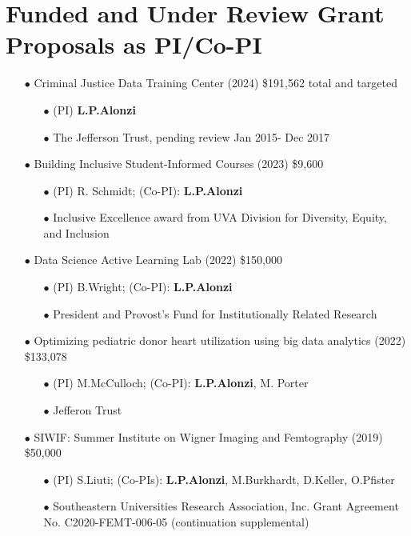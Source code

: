 \documentclass{article}[10pt]
\begin{document}
\section*{Funded and Under Review Grant Proposals as PI/Co-PI}
\begin{itemize}

\item[$\bullet$] Criminal Justice Data Training Center (2024) \$191,562 total and targeted
\begin{itemize}
\item[$\bullet$] (PI) {\bf L.P.Alonzi}
\item[$\bullet$] The Jefferson Trust, pending review Jan 2015- Dec 2017
\end{itemize}


\item[$\bullet$] Building Inclusive Student-Informed Courses (2023) \$9,600
\begin{itemize}
\item[$\bullet$] (PI) R. Schmidt; (Co-PI): {\bf L.P.Alonzi}
\item[$\bullet$] Inclusive Excellence award from UVA Division for Diversity, Equity, and Inclusion
\end{itemize}
\item[$\bullet$] Data Science Active Learning Lab (2022) \$150,000
\begin{itemize}
\item[$\bullet$] (PI) B.Wright; (Co-PI): {\bf L.P.Alonzi}
\item[$\bullet$] President and Provost’s Fund for Institutionally Related Research
\end{itemize}
\item[$\bullet$] Optimizing pediatric donor heart utilization using big data analytics (2022) \$133,078
\begin{itemize}
\item[$\bullet$] (PI) M.McCulloch; (Co-PI): {\bf L.P.Alonzi}, M. Porter
\item[$\bullet$] Jefferon Trust
\end{itemize}
\item[$\bullet$] SIWIF: Summer Institute on Wigner Imaging and Femtography (2019) \$50,000
\begin{itemize}
\item[$\bullet$] (PI) S.Liuti; (Co-PIs): {\bf L.P.Alonzi}, M.Burkhardt, D.Keller, O.Pfister
\item[$\bullet$] Southeastern Universities Research Association, Inc. Grant Agreement No. C2020-FEMT-006-05 (continuation supplemental)

\end{itemize}
\end{itemize}
\end{document}
